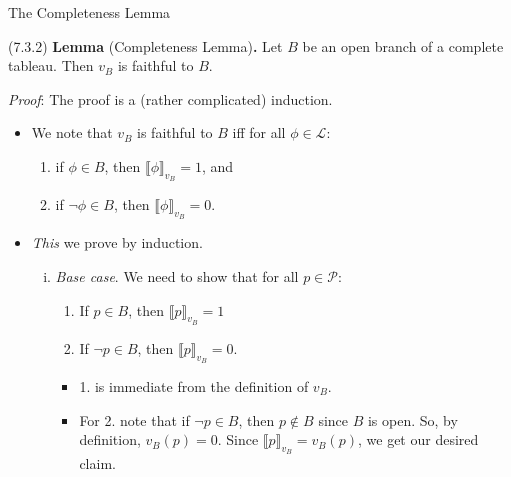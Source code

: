 \begin{frame}{The Completeness Lemma}

(7.3.2) \textbf{Lemma} (Completeness Lemma)\textbf{.} Let $B$ be an open branch of a complete tableau. Then $v_B$ is faithful to $B$.

\emph{Proof}: The proof is a (rather complicated) induction.

	\begin{itemize}
	
		\item We note that $v_B$ is faithful to $B$ iff for all $\phi\in\mathcal{L}$:
	\begin{enumerate}[1.]
	
		\item if $\phi\in B$, then $\llbracket\phi\rrbracket_{v_B}=1$, and 
		\item if $\neg \phi\in B$, then $\llbracket\phi\rrbracket_{v_B}=0$.
	
	\end{enumerate}
	
		\item \emph{This} we prove by induction.
		
		\begin{enumerate}[(i)]
	
		\item \emph{Base case}. We need to show that for all $p\in \mathcal{P}$:
		\begin{enumerate}[1.]
		 	\item If $p\in B$, then $\llbracket p\rrbracket_{v_B}=1$
			\item If $\neg p\in B$, then $\llbracket p\rrbracket_{v_B}=0$.
		\end{enumerate}
		
		\begin{itemize}
		
		\item 1. is immediate from the definition of $v_B$. 
		
		\item For 2. note that if $\neg p\in B$, then $p\notin B$ since $B$ is open. So, by definition, $v_B(p)=0$. Since $\llbracket p\rrbracket_{v_B}=v_B(p)$, we get our desired claim.
		
		\end{itemize}
		
		\end{enumerate}
	
	\end{itemize}

\end{frame}

